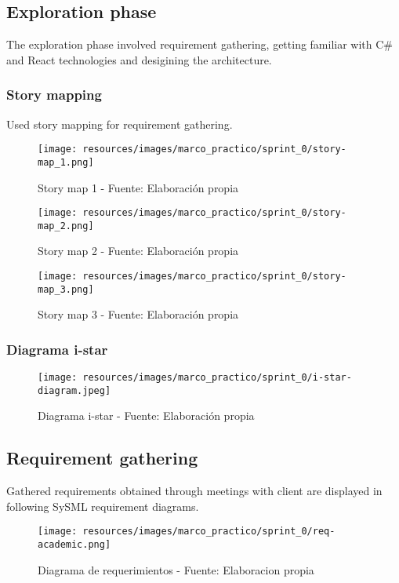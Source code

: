 \subsection{Exploration phase}
The exploration phase involved requirement gathering, getting familiar with C\# and React technologies and desigining the architecture.

\subsubsection{Story mapping}
Used story mapping for requirement gathering.
\begin{figure}[H]
    \centering
    \texttt{[image: resources/images/marco\_practico/sprint\_0/story-map\_1.png]}
    \caption{Story map 1 - Fuente: Elaboración propia}
    \label{fig:story_map_1}
\end{figure}
\begin{figure}[H]
    \centering
    \texttt{[image: resources/images/marco\_practico/sprint\_0/story-map\_2.png]}
    \caption{Story map 2 - Fuente: Elaboración propia}
    \label{fig:story_map_2}
\end{figure}
\begin{figure}[H]
    \centering
    \texttt{[image: resources/images/marco\_practico/sprint\_0/story-map\_3.png]}
    \caption{Story map 3 - Fuente: Elaboración propia}
    \label{fig:story_map_3}
\end{figure}

\subsubsection{Diagrama i-star}
\begin{figure}[H]
    \centering
    \texttt{[image: resources/images/marco\_practico/sprint\_0/i-star-diagram.jpeg]}
    \caption{Diagrama i-star - Fuente: Elaboración propia}
    \label{fig:i-star}
\end{figure}

\subsection{Requirement gathering}
Gathered requirements obtained through meetings with client are displayed in following SySML requirement diagrams.

\begin{figure}
    \texttt{[image: resources/images/marco\_practico/sprint\_0/req-academic.png]}
    \caption{Diagrama de requerimientos - Fuente: Elaboracion propia}\label{fig:req-academic}
\end{figure}

